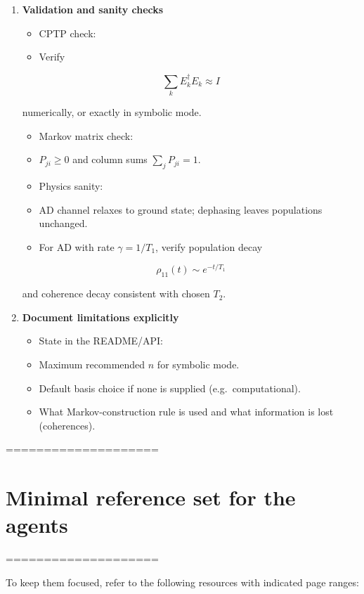\documentclass[11pt]{article}
\begin{document}
\begin{enumerate}
   These give known steady states and known $T_1$, $T_2$ relations for validation.

\item \textbf{Validation and sanity checks}  
\begin{itemize}
\item CPTP check:
\item Verify
\end{itemize}
       
\begin{equation}
\sum_k E_k^\dagger E_k \approx I
\end{equation}

       numerically, or exactly in symbolic mode.  
\begin{itemize}
\item Markov matrix check:
\item $P_{ji} \ge 0$ and column sums $\sum_j P_{ji} = 1$.  
\item Physics sanity:
\item AD channel relaxes to ground state; dephasing leaves populations unchanged.  
\item For AD with rate $\gamma = 1/T_1$, verify population decay
\end{itemize}
       
\begin{equation}
\rho_{11}(t) \sim e^{-t/T_1}
\end{equation}

       and coherence decay consistent with chosen $T_2$.

\item \textbf{Document limitations explicitly}  
\begin{itemize}
\item State in the README/API:
\item Maximum recommended $n$ for symbolic mode.  
\item Default basis choice if none is supplied (e.g.\ computational).  
\item What Markov-construction rule is used and what information is lost (coherences).
\end{itemize}
\end{enumerate}

====================
\section{Minimal reference set for the agents}
====================

To keep them focused, refer to the following resources with indicated page ranges:
\end{document}
